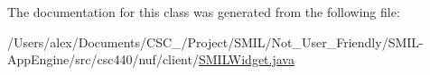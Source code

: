 The documentation for this class was generated from the following file\-:\begin{DoxyCompactItemize}
\item 
/\-Users/alex/\-Documents/\-C\-S\-C\-\_/\-Project/\-S\-M\-I\-L/\-Not\-\_\-\-User\-\_\-\-Friendly/\-S\-M\-I\-L-\/\-App\-Engine/src/csc440/nuf/client/\hyperlink{_s_m_i_l_widget_8java}{S\-M\-I\-L\-Widget.\-java}\end{DoxyCompactItemize}
